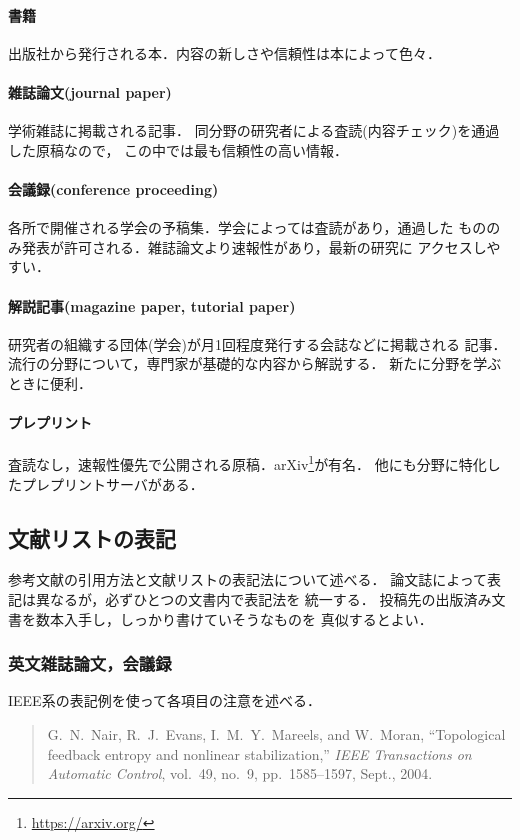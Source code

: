 \documentclass[a4paper,10pt,twocolumn,dvipdfmx]{jsarticle}
\theoremstyle{definition}
\begin{document}
\paragraph{書籍}
出版社から発行される本．内容の新しさや信頼性は本によって色々．

\paragraph{雑誌論文(journal paper)}
学術雑誌に掲載される記事．
同分野の研究者による査読(内容チェック)を通過した原稿なので，
この中では最も信頼性の高い情報．

\paragraph{会議録(conference proceeding)}
各所で開催される学会の予稿集．学会によっては査読があり，通過した
もののみ発表が許可される．雑誌論文より速報性があり，最新の研究に
アクセスしやすい．

\paragraph{解説記事(magazine paper, tutorial paper)}
研究者の組織する団体(学会)が月1回程度発行する会誌などに掲載される
記事．流行の分野について，専門家が基礎的な内容から解説する．
新たに分野を学ぶときに便利．

\paragraph{プレプリント}
査読なし，速報性優先で公開される原稿．arXiv\footnote{\url{https://arxiv.org/}}が有名．
他にも分野に特化したプレプリントサーバがある．

\subsection{文献リストの表記}
参考文献の引用方法と文献リストの表記法について述べる．
論文誌によって表記は異なるが，必ずひとつの文書内で表記法を
統一する．
投稿先の出版済み文書を数本入手し，しっかり書けていそうなものを
真似するとよい．

\subsubsection{英文雑誌論文，会議録}\label{sec:ref-enj}
IEEE系の表記例を使って各項目の注意を述べる．
\begin{quote}
 G.~N.~Nair, R.~J.~Evans, I.~M.~Y.~Mareels, and W.~Moran,
 ``Topological feedback entropy and nonlinear stabilization,''
 \emph{IEEE Transactions on Automatic Control},
 vol.~49, no.~9, pp.~1585--1597, Sept., 2004.
\end{quote}
\end{document}
